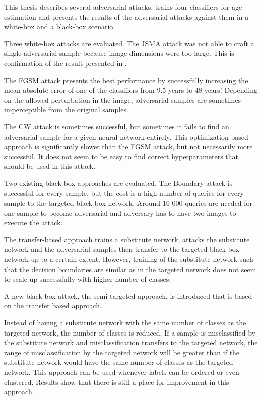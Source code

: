 This thesis describes several adversarial attacks, trains four classifiers for age estimation and presents the results of the adversarial attacks against them in a white-box and a black-box scenario.

Three white-box attacks are evaluated.
The JSMA attack was not able to craft a single adversarial sample because image dimensions were too large. This is confirmation of the result presented in \cite{DBLP:journals/corr/CarliniW16a}.

The FGSM attack presents the best performance by successfully increasing the mean absolute error of one of the classifiers from 9.5 years to 48 years! Depending on the allowed perturbation in the image, adversarial samples are sometimes imperceptible from the original samples.

The CW attack is sometimes successful, but sometimes it fails to find an adversarial sample for a given neural network entirely. This optimization-based approach is significantly slower than the FGSM attack, but not necessarily more successful. It does not seem to be easy to find correct hyperparameters that should be used in this attack.

Two existing black-box approaches are evaluated. 
The Boundary attack is successful for every sample, but the cost is a high number of queries for every sample to the targeted black-box network. Around 16 000 queries are needed for one sample to become adversarial and adversary has to have two images to execute the attack. 

The transfer-based approach trains a substitute network, attacks the substitute network and the adversarial samples then transfer to the targeted black-box network up to a certain extent. However, training of the substitute network such that the decision boundaries are similar as in the targeted network does not seem to scale up successfully with higher number of classes.

A new black-box attack, the semi-targeted approach, is introduced that is based on the transfer based approach. 

Instead of having a substitute network with the same number of classes as the targeted network, the number of classes is reduced. If a sample is misclassified by the substitute network and misclassification transfers to the targeted network, the range of misclassification by the targeted network will be greater than if the substitute network would have the same number of classes as the targeted network. This approach can be used whenever labels can be ordered or even clustered. Results show that there is still a place for improvement in this approach.


